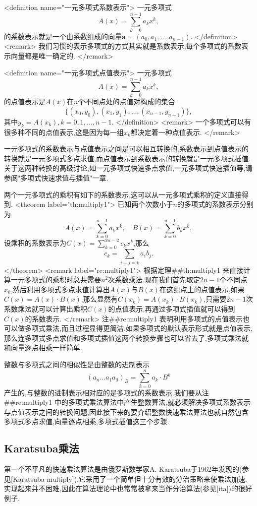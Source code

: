 \documentclass{ctexart}
\newcommand\mtcasCite[1]{[#1]}
\begin{document}
<definition  name="一元多项式系数表示">
一元多项式$$A(x)=\sum_{k=0}^{n-1}a_kx^k,$$的系数表示就是一个由系数组成的向量$\mathbf{a}=(a_0,a_1,\ldots,a_{n-1})$.
</definition>
<remark>
我们习惯的表示多项式的方式其实就是系数表示,每个多项式的系数表示向量都是唯一确定的.
</remark>

<definition  name="一元多项式点值表示">
一元多项式$$A(x)=\sum_{k=0}^{n-1}a_kx^k,$$的点值表示是$A(x)$在$n$个不同点处的点值对构成的集合$$\{(x_0,y_0),(x_1,y_1),\ldots,(x_{n-1},y_{n-1})\},$$其中$y_k=A(x_k),k=0,1,\ldots,n-1$.
</definition>
<remark>
一个多项式可以有很多种不同的点值表示,这是因为每一组$x_k$都决定着一种点值表示.
</remark>

一元多项式的系数表示与点值表示之间是可以相互转换的,系数表示到点值表示的转换就是一元多项式多点求值,而点值表示到系数表示的转换就是一元多项式插值.关于这两种转换的高级讨论,如一元多项式快速多点求值,一元多项式快速插值等,请参阅"多项式快速求值与插值"一章.

两个一元多项式的乘积有如下的系数表示,这可以从一元多项式乘积的定义直接得到.
<theorem label="th:multiply1">
已知两个次数小于$n$的多项式的系数表示分别为$$A(x)=\sum_{k=0}^{n-1}a_kx^k,\quad B(x)=\sum_{k=0}^{n-1}b_kx^k,$$设乘积的系数表示为$C(x)=\sum\limits_{k=0}^{2n-2}c_kx^k$,那么$$c_k=\sum_{i+j=k}a_ib_j.$$
</theorem>
<remark label="re:multiply1">
根据定理##th:multiply1
来直接计算一元多项式的乘积时总共需要$n^2$次系数乘法.现在我们首先取定$2n-1$个不同点$x_k$,然后利用多项式多点求值计算出$A(x)$与$B(x)$在这组点上的点值表示,如果$C(x)=A(x)\cdot B(x)$,那么显然有$C(x_k)=A(x_k)\cdot B(x_k)$,只需要$2n-1$次系数乘法就可以计算出乘积$C(x)$的点值表示,再通过多项式插值就可以得到$C(x)$的系数表示.
</remark>
注##re:multiply1
表明利用多项式的点值表示也可以做多项式乘法,而且过程显得更简洁.如果多项式的默认表示形式就是点值表示,那么连多项式多点求值和多项式插值这两个转换步骤也可以省去了,多项式乘法就和向量逐点相乘一样简单.

整数与多项式之间的相似性是由整数的进制表示$$(a_n\ldots a_1a_0)_B=\sum_{k=0}^na_k\cdot B^k$$产生的,与整数的进制表示相对应的是多项式的系数表示.我们要从注##re:multiply1
中的多项式乘法算法中产生整数算法,就必须解决多项式系数表示与点值表示之间的转换问题,因此接下来的要介绍整数快速乘法算法也就自然包含多项式多点求值,向量逐点相乘,多项式插值这三个步骤.

\subsection{Karatsuba乘法}

第一个不平凡的快速乘法算法是由俄罗斯数学家A. Karatsuba于1962年发现的(参见\mtcasCite{Karatsuba-multiply}),它采用了一个简单但十分有效的分治策略来使乘法加速.实现起来并不困难,因此在算法理论中也常常被拿来当作分治算法(参见\mtcasCite{ita})的很好例子.
\end{document}
